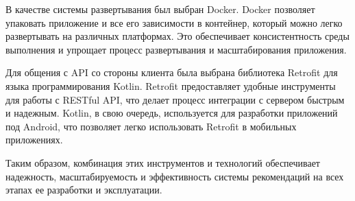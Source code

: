 В качестве системы развертывания был выбран Docker.
Docker позволяет упаковать приложение и все его зависимости в контейнер, который можно легко развертывать на различных
платформах.
Это обеспечивает консистентность среды выполнения и упрощает процесс развертывания и масштабирования приложения.

Для общения с API со стороны клиента была выбрана библиотека Retrofit для языка программирования Kotlin.
Retrofit предоставляет удобные инструменты для работы с RESTful API, что делает процесс интеграции с сервером быстрым
и надежным.
Kotlin, в свою очередь, используется для разработки приложений под Android, что позволяет легко использовать Retrofit
в мобильных приложениях.

Таким образом, комбинация этих инструментов и технологий обеспечивает надежность, масштабируемость и эффективность
системы рекомендаций на всех этапах ее разработки и эксплуатации.









